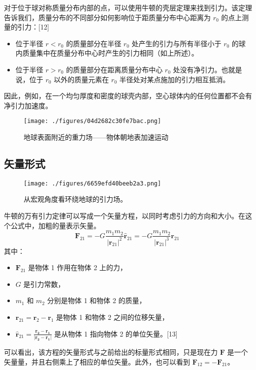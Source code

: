 对于位于球对称质量分布内部的点，可以使用牛顿的壳层定理来找到引力。该定理告诉我们，质量分布的不同部分如何影响位于距质量分布中心距离为 \( r_0 \) 的点上测量的引力：[12]
\begin{itemize}
\item 位于半径 \( r < r_0 \) 的质量部分在半径 \( r_0 \) 处产生的引力与所有半径小于 \( r_0 \) 的球内质量集中在质量分布中心时产生的引力相同（如上所述）。

\item 位于半径 \( r > r_0 \) 的质量部分在距离质量分布中心 \( r_0 \) 处没有净引力。也就是说，位于 \( r_0 \) 以外的质量元素在 \( r_0 \) 半径处对某点施加的引力相互抵消。
\end{itemize}

因此，例如，在一个均匀厚度和密度的球壳内部，空心球体内的任何位置都不会有净引力加速度。
\begin{figure}[ht]
\centering
\texttt{[image: ./figures/04d2682c30fe7bac.png]}
\caption{地球表面附近的重力场——物体朝地表加速运动} \label{fig_NEWW_4}
\end{figure}
\subsection{矢量形式}
\begin{figure}[ht]
\centering
\texttt{[image: ./figures/6659efd40beeb2a3.png]}
\caption{从宏观角度看环绕地球的引力场。} \label{fig_NEWW_5}
\end{figure}
牛顿的万有引力定律可以写成一个矢量方程，以同时考虑引力的方向和大小。在这个公式中，加粗的量表示矢量。
\[
\mathbf{F}_{21} = -G \frac{m_1 m_2}{|\mathbf{r}_{21}|^2} \hat{\mathbf{r}}_{21} = -G \frac{m_1 m_2}{|\mathbf{r}_{21}|^3} \mathbf{r}_{21}~
\]
其中：
\begin{itemize}
\item \(\mathbf{F}_{21}\) 是物体 1 作用在物体 2 上的力，
\item \(G\) 是引力常数，
\item \(m_1\) 和 \(m_2\) 分别是物体 1 和物体 2 的质量，
\item \(\mathbf{r}_{21} = \mathbf{r}_2 - \mathbf{r}_1\) 是物体 1 和物体 2 之间的位移矢量，
\item \(\hat{\mathbf{r}}_{21} = \frac{\mathbf{r_2 - r_1}}{|\mathbf{r_2 - r_1}|}\) 是从物体 1 指向物体 2 的单位矢量。[13]
\end{itemize}
可以看出，该方程的矢量形式与之前给出的标量形式相同，只是现在力 \(\mathbf{F}\) 是一个矢量量，并且右侧乘上了相应的单位矢量。此外，也可以看到 \(\mathbf{F}_{12} = -\mathbf{F}_{21}\)。
